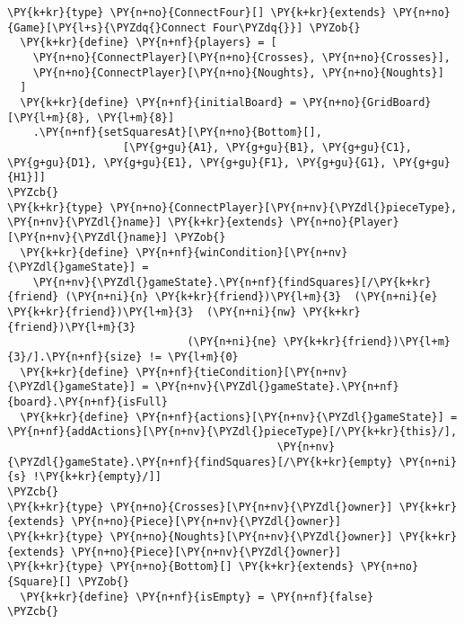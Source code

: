 \begin{Verbatim}[commandchars=\\\{\}]
\PY{k+kr}{type} \PY{n+no}{ConnectFour}[] \PY{k+kr}{extends} \PY{n+no}{Game}[\PY{l+s}{\PYZdq{}Connect Four\PYZdq{}}] \PYZob{}
  \PY{k+kr}{define} \PY{n+nf}{players} = [
    \PY{n+no}{ConnectPlayer}[\PY{n+no}{Crosses}, \PY{n+no}{Crosses}],
    \PY{n+no}{ConnectPlayer}[\PY{n+no}{Noughts}, \PY{n+no}{Noughts}]
  ]
  \PY{k+kr}{define} \PY{n+nf}{initialBoard} = \PY{n+no}{GridBoard}[\PY{l+m}{8}, \PY{l+m}{8}]
    .\PY{n+nf}{setSquaresAt}[\PY{n+no}{Bottom}[],
                  [\PY{g+gu}{A1}, \PY{g+gu}{B1}, \PY{g+gu}{C1}, \PY{g+gu}{D1}, \PY{g+gu}{E1}, \PY{g+gu}{F1}, \PY{g+gu}{G1}, \PY{g+gu}{H1}]]
\PYZcb{}
\PY{k+kr}{type} \PY{n+no}{ConnectPlayer}[\PY{n+nv}{\PYZdl{}pieceType}, \PY{n+nv}{\PYZdl{}name}] \PY{k+kr}{extends} \PY{n+no}{Player}[\PY{n+nv}{\PYZdl{}name}] \PYZob{}
  \PY{k+kr}{define} \PY{n+nf}{winCondition}[\PY{n+nv}{\PYZdl{}gameState}] =
    \PY{n+nv}{\PYZdl{}gameState}.\PY{n+nf}{findSquares}[/\PY{k+kr}{friend} (\PY{n+ni}{n} \PY{k+kr}{friend})\PY{l+m}{3}  (\PY{n+ni}{e} \PY{k+kr}{friend})\PY{l+m}{3}  (\PY{n+ni}{nw} \PY{k+kr}{friend})\PY{l+m}{3}
                            (\PY{n+ni}{ne} \PY{k+kr}{friend})\PY{l+m}{3}/].\PY{n+nf}{size} != \PY{l+m}{0}
  \PY{k+kr}{define} \PY{n+nf}{tieCondition}[\PY{n+nv}{\PYZdl{}gameState}] = \PY{n+nv}{\PYZdl{}gameState}.\PY{n+nf}{board}.\PY{n+nf}{isFull}
  \PY{k+kr}{define} \PY{n+nf}{actions}[\PY{n+nv}{\PYZdl{}gameState}] = \PY{n+nf}{addActions}[\PY{n+nv}{\PYZdl{}pieceType}[/\PY{k+kr}{this}/],
                                          \PY{n+nv}{\PYZdl{}gameState}.\PY{n+nf}{findSquares}[/\PY{k+kr}{empty} \PY{n+ni}{s} !\PY{k+kr}{empty}/]]
\PYZcb{}
\PY{k+kr}{type} \PY{n+no}{Crosses}[\PY{n+nv}{\PYZdl{}owner}] \PY{k+kr}{extends} \PY{n+no}{Piece}[\PY{n+nv}{\PYZdl{}owner}]
\PY{k+kr}{type} \PY{n+no}{Noughts}[\PY{n+nv}{\PYZdl{}owner}] \PY{k+kr}{extends} \PY{n+no}{Piece}[\PY{n+nv}{\PYZdl{}owner}]
\PY{k+kr}{type} \PY{n+no}{Bottom}[] \PY{k+kr}{extends} \PY{n+no}{Square}[] \PYZob{}
  \PY{k+kr}{define} \PY{n+nf}{isEmpty} = \PY{n+nf}{false}
\PYZcb{}
\end{Verbatim}
